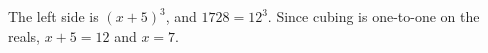 The left side is $(x+5)^3$, and $1728=12^3$. Since cubing is one-to-one on the reals, $x+5=12$ and $x=\boxed{7}$.
